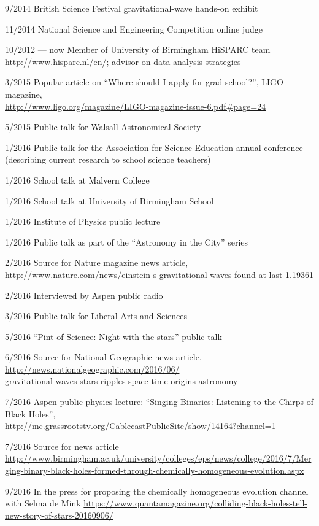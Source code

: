 \documentclass[margin,line]{res}
\begin{document}
\begin{resume}
9/2014	British Science Festival gravitational-wave hands-on exhibit

11/2014	National Science and Engineering Competition online judge

10/2012 --- now 	Member of University of Birmingham HiSPARC team \url{http://www.hisparc.nl/en/}; advisor on data analysis strategies

3/2015	Popular article on ``Where should I apply for grad school?'', LIGO magazine,\\ \url{http://www.ligo.org/magazine/LIGO-magazine-issue-6.pdf\#page=24}

5/2015 	Public talk for Walsall Astronomical Society

1/2016	Public talk for the Association for Science Education annual conference (describing current research to school science teachers)

1/2016 	School talk at Malvern College

1/2016 	School talk at University of Birmingham School

1/2016	Institute of Physics public lecture

1/2016	Public talk as part of the ``Astronomy in the City'' series

2/2016	Source for Nature magazine news article,\\ \url{http://www.nature.com/news/einstein-s-gravitational-waves-found-at-last-1.19361}

2/2016	Interviewed by Aspen public radio

3/2016	Public talk for Liberal Arts and Sciences 

5/2016	``Pint of Science: Night with the stars'' public talk

6/2016	Source for National Geographic news article,\\ \url{http://news.nationalgeographic.com/2016/06/}\\\url{gravitational-waves-stars-ripples-space-time-origins-astronomy}

7/2016	Aspen public physics lecture: ``Singing Binaries: Listening to the Chirps of Black Holes'',\\\url{http://mc.grassrootstv.org/CablecastPublicSite/show/14164?channel=1}

7/2016 	Source for news article\\ \url{http://www.birmingham.ac.uk/university/colleges/eps/news/college/2016/7/Merging-binary-black-holes-formed-through-chemically-homogeneous-evolution.aspx}

9/2016 	In the press for proposing the chemically homogeneous evolution channel with Selma de Mink \url{https://www.quantamagazine.org/colliding-black-holes-tell-new-story-of-stars-20160906/}


\end{resume}
\end{document}
